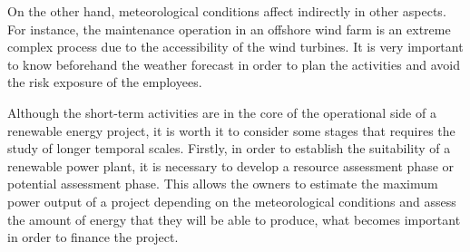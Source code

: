 
On the other hand, meteorological conditions affect indirectly in other aspects. For instance, the maintenance operation in an offshore wind farm is an extreme complex process due to the accessibility of the wind turbines. It is very important to know beforehand the weather forecast in order to plan the activities and avoid the risk exposure of the employees.


Although the short-term activities are in the core of the operational side of a renewable energy project, it is worth it to consider some stages that requires the study of longer temporal scales. Firstly, in order to establish the suitability of a renewable power plant, it is necessary to develop a resource assessment phase or potential assessment phase. This allows the owners to estimate the maximum power output of a project depending on the meteorological conditions and assess the amount of energy that they will be able to produce, what becomes important in order to finance the project.  




